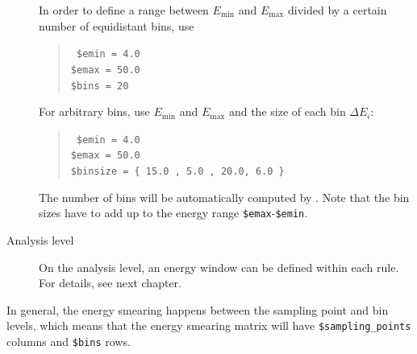 \begin{description}
In order to define a range between $E_\mathrm{min}$
and $E_\mathrm{max}$ divided by a certain number of equidistant bins,
use
\begin{quote}
{\tt
\$emin = 4.0\\
\$emax = 50.0\\
\$bins = 20
}
\end{quote}
For arbitrary bins, use $E_\mathrm{min}$
and $E_\mathrm{max}$ and the size of each bin  $\Delta E_i$:
\begin{quote}
{\tt
\$emin = 4.0\\
\$emax = 50.0\\
\$binsize = \{  15.0 , 5.0 , 20.0, 6.0 \} 
}
\end{quote}
The number of bins will be automatically computed by \GLOBES . Note that the
bin sizes have to add up to the energy range {\tt \$emax}-{\tt \$emin}.
\item[Analysis level]
On the analysis level, an energy window can be defined within each rule. For
details, see next chapter.
\end{description}
In general, the energy smearing happens between the sampling point and bin levels, which means that the energy smearing matrix will have {\tt \$sampling\_points} columns and {\tt \$bins} rows. 

